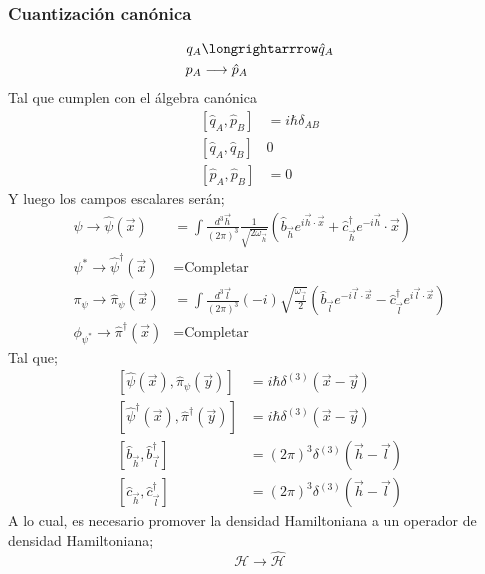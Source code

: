 \documentclass[../main.tex]{subfiles}
\begin{document}
\subsubsection{Cuantización canónica}
\begin{align*}
  q_A & \longrightarrrow \hat{q}_A \\
  p_A & \longrightarrow \hat{p}_A
\end{align*}
Tal que cumplen con el álgebra canónica
\begin{align*}
  \left[ \hat{q}_A , \hat{p}_B \right] & = i\hbar \delta_{AB} \\
  \left[ \hat{q}_A , \hat{q}_B \right] & 0 \\
  \left[ \hat{p}_A , \hat{p}_B \right] & = 0
\end{align*}
Y luego los campos escalares serán;
\begin{align*}
  \psi \longrightarrow \hat{\psi}(\vec{x}) & = \int \frac{d^3\vec{h}}{\left( 2\pi \right)^3} \frac{1}{\sqrt{2\omega_{\vec{h}}}} \left( \hat{b}_{\vec{h}} e^{i\vec{h}\cdot\vec{x}} + \hat{c}_{\vec{h}}^\dagger e^{-i\vec{h}}\cdot\vec{x} \right) \\
  \psi^* \longrightarrow \hat{\psi}^\dagger(\vec{x}) & = \text{Completar} \\
  \pi_\psi \longrightarrow \hat{\pi}_\psi(\vec{x}) & = \int \frac{d^3\vec{l}}{(2\pi)^3} (-i) \sqrt{\frac{\omega_{\vec{l}}}{2}} \left( \hat{b}_{\vec{l}} e^{-i\vec{l}\cdot\vec{x}}  -\hat{c}_{\vec{l}}^\dagger e^{i\vec{l}\cdot\vec{x}} \right) \\
  \phi_{\psi^*}\longrightarrow \hat{\pi}^\dagger(\vec{x}) &  = \text{Completar} 
\end{align*}
Tal que;
\begin{align*}
  \left[ \hat{\psi}(\vec{x}) , \hat{\pi}_\psi (\vec{y}) \right] & = i\hbar \delta^{(3)}(\vec{x}-\vec{y}) \\
  \left[ \hat{\psi}^\dagger (\vec{x}) , \hat{\pi}^\dagger(\vec{y}) \right] & = i\hbar \delta^{(3)}(\vec{x}-\vec{y})\\
  \left[ \hat{b}_{\vec{h}} , \hat{b}_{\vec{l}}^\dagger \right] & = (2\pi)^3 \delta^{(3)}(\vec{h}-\vec{l}) \\
  \left[ \hat{c}_{\vec{h}} , \hat{c}_{\vec{l}}^\dagger \right] & = (2\pi)^3 \delta^{(3)} (\vec{h}-\vec{l})
\end{align*}
A lo cual, es necesario promover la densidad Hamiltoniana a un operador de densidad Hamiltoniana;
\begin{equation}
  \mathcal{H} \longrightarrow \hat{\mathcal{H}} 
 \end{equation}
\end{document}
